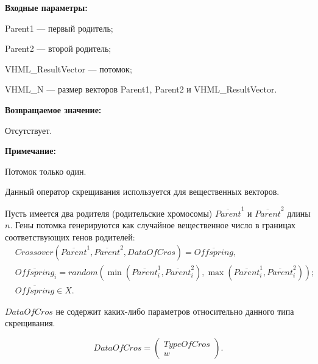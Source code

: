 \textbf{Входные параметры:}
 
Parent1 --- первый родитель;
 
Parent2 --- второй родитель;
 
VHML\_ResultVector --- потомок;

 
VHML\_N --- размер векторов Parent1, Parent2 и VHML\_ResultVector.

\textbf{Возвращаемое значение:}

 Отсутствует.
 
\textbf{ Примечание:}

 Потомок только один.
 
Данный оператор скрещивания используется для вещественных векторов.

Пусть имеется два родителя (родительские хромосомы) $ \overline{Parent}^1 $ и $ \overline{Parent}^2$ длины $n$. Гены потомка генерируются как случайное вещественное число в границах соответствующих генов родителей:
\begin{align}
\label{SetOfOperatorsAlgorithms:eq:FlatCrossoverForReal}
&Crossover \left( \overline{Parent}^1, \overline{Parent}^2, DataOfCros\right)= \overline{Offspring}, \\
& \overline{Offspring}_i=random\left(\min\left(\overline{Parent}^1_i, \overline{Parent}^2_i \right),\max\left(\overline{Parent}^1_i, \overline{Parent}^2_i \right)  \right);\nonumber\\
&\overline{Offspring}\in X.\nonumber
\end{align}

$ DataOfCros $ не содержит каких-либо параметров относительно данного типа скрещивания.

\begin{equation}
DataOfCros=\left( \begin{array}{c} TypeOfCros \\ w \end{array} \right).
\end{equation}